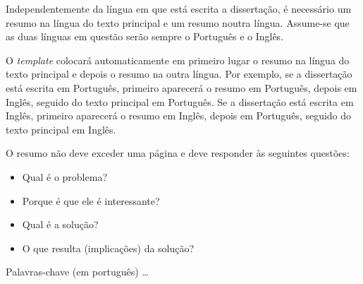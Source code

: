 
Independentemente da língua em que está escrita a dissertação, é necessário um resumo na língua do texto principal e um resumo noutra língua.  Assume-se que as duas línguas em questão serão sempre o Português e o Inglês.

O \emph{template} colocará automaticamente em primeiro lugar o resumo na língua do texto principal e depois o resumo na outra língua.  Por exemplo, se a dissertação está escrita em Português, primeiro aparecerá o resumo em Português, depois em Inglês, seguido do texto principal em Português. Se a dissertação está escrita em Inglês, primeiro aparecerá o resumo em Inglês, depois em Português, seguido do texto principal em Inglês.

O resumo não deve exceder uma página e deve responder às seguintes questões:
\begin{itemize}
	\item Qual é o problema?
	\item Porque é que ele é interessante?
	\item Qual é a solução?
	\item O que resulta (implicações) da solução?
\end{itemize}

\begin{keywords}
Palavras-chave (em português) \ldots
\end{keywords}
